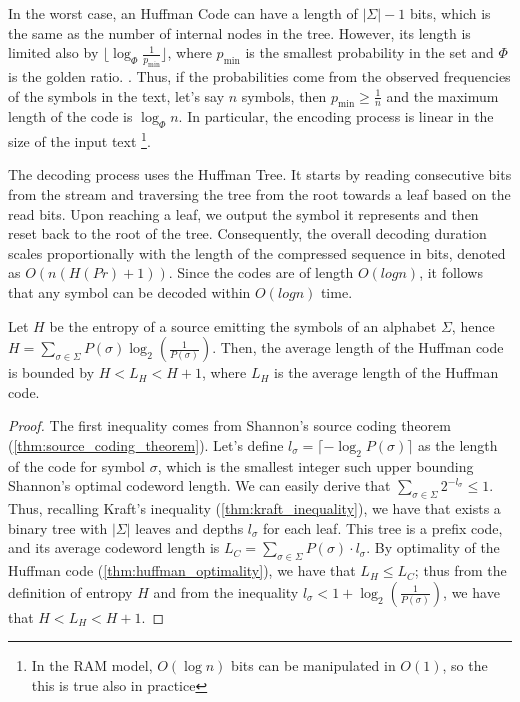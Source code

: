 \noindent In the worst case, an Huffman Code can have a length of $|\Sigma|-1$ bits, which is the same as the number of internal nodes in the tree. However, its length is limited also by $\lfloor \log_\varPhi \frac{1}{p_{\min}} \rfloor$, where $p_{\min}$ is the smallest probability in the set and $\varPhi$ is the golden ratio. \cite{navarro2016compact}. Thus, if the probabilities come from the observed frequencies of the symbols in the text, let's say $n$ symbols, then $p_{\min} \geq \frac{1}{n}$ and the maximum length of the code is $\log_\varPhi n $. In particular, the encoding process is linear in the size of the input text \footnote{In the RAM model, $O(\log n)$ bits can be manipulated in $O(1)$, so the this is true also in practice}.

The decoding process uses the Huffman Tree. It starts by reading consecutive bits from the stream and traversing the tree from the root towards a leaf based on the read bits. Upon reaching a leaf, we output the symbol it represents and then reset back to the root of the tree. Consequently, the overall decoding duration scales proportionally with the length of the compressed sequence in bits, denoted as $O(n(H(Pr) + 1))$. Since the codes are of length $O(log n)$, it follows that any symbol can be decoded within $O(log n)$ time.

\begin{theorem}
    Let $H$ be the entropy of a source emitting the symbols of an alphabet $\Sigma$, hence $H = \sum_{\sigma \in \Sigma} P(\sigma)\log_2\left(\frac{1}{P(\sigma)}\right)$. Then, the average length of the Huffman code is bounded by $H < L_H < H + 1$, where $L_H$ is the average length of the Huffman code.
\end{theorem}
\begin{proof}
    The first inequality comes from Shannon's source coding theorem (\autoref{thm:source_coding_theorem}). Let's define $l_\sigma = \lceil -\log_2 P(\sigma) \rceil$ as the length of the code for symbol $\sigma$, which is the smallest integer such upper bounding Shannon's optimal codeword length. We can easily derive that $\sum_{\sigma \in \Sigma} 2^{-l_\sigma} \leq 1$. Thus, recalling Kraft's inequality (\autoref{thm:kraft_inequality}), we have that exists a binary tree with $|\Sigma|$ leaves and depths $l_\sigma$ for each leaf. This tree is a prefix code, and its average codeword length is $L_C = \sum_{\sigma \in \Sigma} P(\sigma) \cdot l_\sigma$. By optimality of the Huffman code (\ref{thm:huffman_optimality}), we have that $L_H \leq L_C$; thus from the definition of entropy $H$ and from the inequality $l_\sigma < 1 + \log_2\left(\frac{1}{P(\sigma)}\right)$, we have that $H < L_H < H + 1$.
\end{proof}

